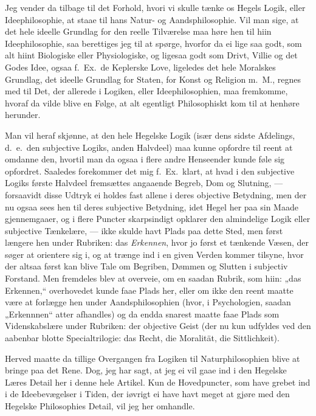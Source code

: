 \documentclass[12pt,a4paper]{book}
\newcommand{\apage}[1]{\marginnote{\footnotesize\textit{[#1]}}}
\begin{document}
Jeg vender da tilbage til det Forhold, hvori vi skulle tænke os Hegels
Logik, eller Ideephilosophie, at staae til hans Natur- og
Aandsphilosophie. Vil man sige, at det hele ideelle Grundlag for den reelle
Tilværelse maa høre hen til hiin Ideephilosophie, saa berettiges jeg til at
spørge, hvorfor da ei lige saa godt, som alt hiint Biologiske eller
Physiologiske, og ligesaa godt som Drivt, Villie og det Godes Idee, ogsaa
f.\ Ex.\ de Keplerske Love, ligeledes det hele Moralskes Grundlag, det
ideelle Grundlag for Staten, for Konst og Religion m.\ M., regnes med til
Det, der allerede i Logiken, eller Ideephilosophien, maa fremkomme, hvoraf
da vilde blive en Følge, at alt egentligt Philosophiskt kom til at henhøre
herunder.

Man vil heraf skjønne, at den hele Hegelske Logik (især dens sidste
Afdelings, d.\ e.\ den subjective Logiks, anden Halvdeel) maa kunne
opfordre til reent at omdanne den, hvortil man da ogsaa i flere andre
Henseender kunde føle sig opfordret. Saaledes forekommer det mig f.\ Ex.\
klart, at hvad i den subjective Logiks første Halvdeel fremsættes angaaende
Begreb, Dom og Slutning, --- forsaavidt disse Udtryk ei holdes fast allene
i deres objective Betydning, men der nu ogsaa sees hen til deres subjective
Betydning, idet Hegel her paa sin Maade gjennemgaaer, og i flere Puncter
skarpsindigt opklarer den almindelige Logik eller subjective \apage{78} Tænkelære,
--- ikke skulde havt Plads paa dette Sted, men først længere hen under
Rubriken: das \emph{Erkennen}, hvor jo først et tænkende Væsen, der søger at
orientere sig i, og at trænge ind i en given Verden kommer tilsyne, hvor
der altsaa først kan blive Tale om Begriben, Dømmen og Slutten i subjectiv
Forstand. Men fremdeles blev at overveie, om en saadan Rubrik, som hiin:
„das Erkennen,“ overhovedet kunde faae Plads her, eller om ikke den reent
maatte være at forlægge hen under Aandsphilosophien (hvor, i Psychologien,
saadan „Erkennnen“ atter afhandles) %
og da endda snarest maatte faae Plads som Videnskabslære under Rubriken:
der objective Geist (der nu kun udfyldes ved den aabenbar blotte
Specialtrilogie: das Recht, die Moralität, die Sittlichkeit).

Herved maatte da tillige Overgangen fra Logiken til Naturphilosophien blive
at bringe paa det Rene. Dog, jeg har sagt, at jeg ei vil gaae ind i den
Hegelske Læres Detail her i denne hele Artikel. Kun de Hovedpuncter, som
have grebet ind i de Ideebevægelser i Tiden, der iøvrigt ei have havt meget
at gjøre med den Hegelske Philosophies Detail, vil jeg her omhandle.
\end{document}
